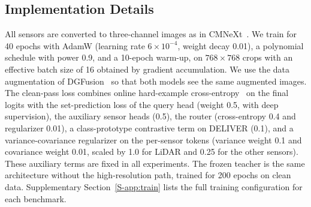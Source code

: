 \subsection{Implementation Details}
All sensors are converted to three-channel images as in CMNeXt~\cite{cmnext2023}. We train for 40 epochs with AdamW (learning rate $6\times10^{-4}$, weight decay 0.01), a polynomial schedule with power 0.9, and a 10-epoch warm-up, on $768\times768$ crops with an effective batch size of 16 obtained by gradient accumulation. We use the data augmentation of DGFusion~\cite{dgfusion2026} so that both models see the same augmented images. The clean-pass loss combines online hard-example cross-entropy~\cite{ohem2016} on the final logits with the set-prediction loss of the query head (weight 0.5, with deep supervision), the auxiliary sensor heads (0.5), the router (cross-entropy 0.4 and regularizer 0.01), a class-prototype contrastive term on DELIVER (0.1), and a variance-covariance regularizer on the per-sensor tokens (variance weight 0.1 and covariance weight 0.01, scaled by 1.0 for LiDAR and 0.25 for the other sensors). These auxiliary terms are fixed in all experiments. The frozen teacher is the same architecture without the high-resolution path, trained for 200 epochs on clean data. Supplementary Section~\ref{S-app:train} lists the full training configuration for each benchmark.

